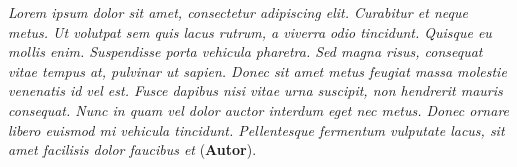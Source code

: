 \vspace*{\fill}

\hspace{\fill}
\begin{minipage}{6cm}
    \begin{singlespace} %
        \textit{Lorem ipsum dolor sit amet, consectetur adipiscing elit. Curabitur et neque metus. Ut volutpat sem quis lacus rutrum, a viverra odio tincidunt. Quisque eu mollis enim. Suspendisse porta vehicula pharetra. Sed magna risus, consequat vitae tempus at, pulvinar ut sapien. Donec sit amet metus feugiat massa molestie venenatis id vel est. Fusce dapibus nisi vitae urna suscipit, non hendrerit mauris consequat. Nunc in quam vel dolor auctor interdum eget nec metus. Donec ornare libero euismod mi vehicula tincidunt. Pellentesque fermentum vulputate lacus, sit amet facilisis dolor faucibus et} (\textbf{Autor}).
    \end{singlespace}
\end{minipage}
